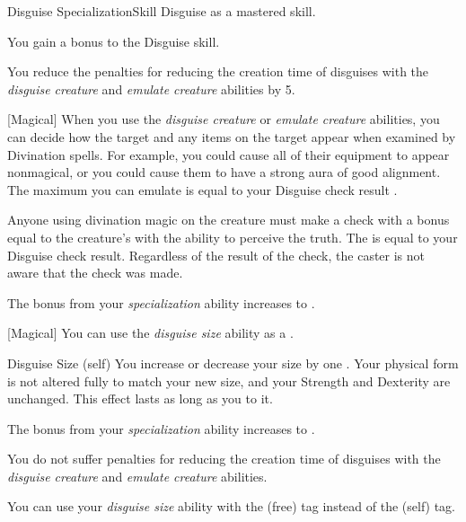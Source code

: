     \begin{feat}{Disguise Specialization}{Skill}
        \featpre Disguise as a mastered skill.

         You gain a  bonus to the Disguise skill.

         You reduce the penalties for reducing the creation time of disguises with the \textit{disguise creature} and \textit{emulate creature} abilities by 5.

        [Magical] When you use the \textit{disguise creature} or \textit{emulate creature} abilities, you can decide how the target and any items on the target appear when examined by Divination spells.
        For example, you could cause all of their equipment to appear nonmagical, or you could cause them to have a strong aura of good alignment.
        The maximum  you can emulate is equal to your Disguise check result .

        Anyone using divination magic on the creature must make a check with a bonus equal to the creature's  with the ability to perceive the truth.
        The  is equal to your Disguise check result.
        Regardless of the result of the check, the caster is not aware that the check was made.

         The bonus from your \textit{specialization} ability increases to .

        [Magical] You can use the \textit{disguise size} ability as a .
        \begin{attuneability}{Disguise Size}
             (self)
            \rankline
            You increase or decrease your size by one .
            Your physical form is not altered fully to match your new size, and your Strength and Dexterity are unchanged.
            This effect lasts as long as you  to it.
        \end{attuneability}

         The bonus from your \textit{specialization} ability increases to .

         You do not suffer penalties for reducing the creation time of disguises with the \textit{disguise creature} and \textit{emulate creature} abilities.

         You can use your \textit{disguise size} ability with the  (free) tag instead of the  (self) tag.
    \end{feat}

